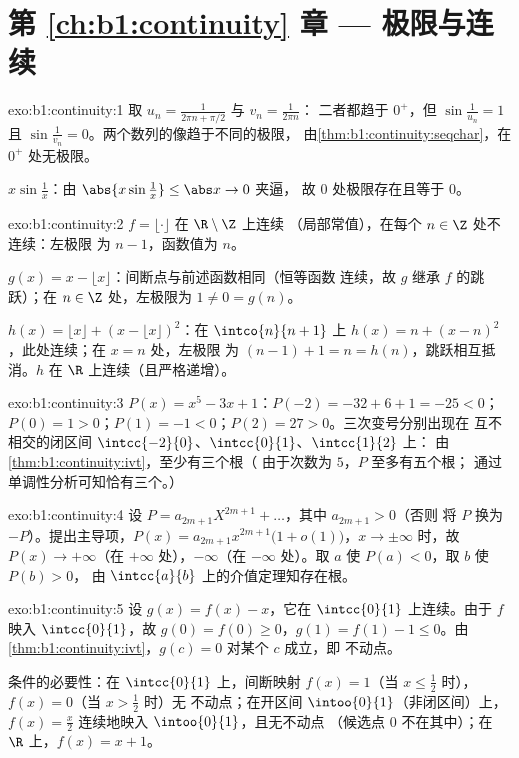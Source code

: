 \section*{第 \ref{ch:b1:continuity} 章 --- 极限与连续}

\begin{solution}{exo:b1:continuity:1}
取 $u_n = \frac{1}{2\pi n + \pi/2}$ 与 $v_n = \frac{1}{2\pi n}$：
二者都趋于 $0^+$，但 $\sin\frac{1}{u_n} = 1$ 且
$\sin\frac{1}{v_n} = 0$。两个数列的像趋于不同的极限，
由\cref{thm:b1:continuity:seqchar}，在 $0^+$ 处无极限。

$x \sin\frac1x$：由 $\abs{x\sin\frac1x} \leq \abs x \to 0$ 夹逼，
故 $0$ 处极限存在且等于 $0$。
\end{solution}

\begin{solution}{exo:b1:continuity:2}
$f = \lfloor\cdot\rfloor$ 在 $\R \setminus \Z$ 上连续
（局部常值），在每个 $n \in \Z$ 处不连续：左极限
为 $n - 1$，函数值为 $n$。

$g(x) = x - \lfloor x\rfloor$：间断点与前述函数相同（恒等函数
连续，故 $g$ 继承 $f$ 的跳跃）；在 $n \in
\Z$ 处，左极限为 $1 \neq 0 = g(n)$。

$h(x) = \lfloor x\rfloor + (x - \lfloor x\rfloor)^2$：在 $\intco{n}{n
+ 1}$ 上 $h(x) = n + (x - n)^2$，此处连续；在 $x = n$ 处，左极限
为 $(n-1) + 1 = n = h(n)$，跳跃相互抵消。$h$ 在
$\R$ 上连续（且严格递增）。
\end{solution}

\begin{solution}{exo:b1:continuity:3}
$P(x) = x^5 - 3x + 1$：$P(-2) = -32 + 6 + 1 = -25 < 0$；$P(0) = 1 >
0$；$P(1) = -1 < 0$；$P(2) = 27 > 0$。三次变号分别出现在
互不相交的闭区间 $\intcc{-2}{0}$、$\intcc{0}{1}$、$\intcc{1}{2}$ 上：
由\cref{thm:b1:continuity:ivt}，至少有三个根（
由于次数为 $5$，$P$ 至多有五个根；
通过单调性分析可知恰有三个。）
\end{solution}

\begin{solution}{exo:b1:continuity:4}
设 $P = a_{2m+1}X^{2m+1} + \dots$，其中 $a_{2m+1} > 0$（否则
将 $P$ 换为 $-P$）。提出主导项，$P(x) = a_{2m+1}
x^{2m+1}\bigl(1 + o(1)\bigr)$，$x \to \pm\infty$ 时，故 $P(x) \to
+\infty$（在 $+\infty$ 处），$-\infty$（在 $-\infty$ 处）。取 $a$ 使
$P(a) < 0$，取 $b$ 使 $P(b) > 0$，
由 $\intcc{a}{b}$ 上的介值定理知存在根。
\end{solution}

\begin{solution}{exo:b1:continuity:5}
设 $g(x) = f(x) - x$，它在 $\intcc{0}{1}$ 上连续。由于 $f$ 映入
$\intcc{0}{1}$，故 $g(0) = f(0) \geq 0$，$g(1) = f(1) - 1 \leq
0$。由\cref{thm:b1:continuity:ivt}，$g(c) = 0$ 对某个 $c$ 成立，即
不动点。

条件的必要性：在 $\intcc{0}{1}$ 上，间断映射
$f(x) = 1$（当 $x \leq \frac12$ 时），$f(x) = 0$（当 $x > \frac12$ 时）无
不动点；在开区间 $\intoo{0}{1}$（非闭区间）上，$f(x) =
\frac x2$ 连续地映入 $\intoo{0}{1}$，且无不动点
（候选点 $0$ 不在其中）；在 $\R$ 上，$f(x) = x + 1$。
\end{solution}

